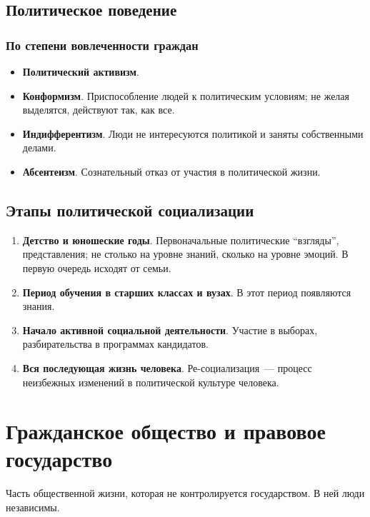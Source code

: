 \documentclass[12pt]{article}
\begin{document}
	\subsection{Политическое поведение}
	
	\subsubsection{По степени вовлеченности граждан}
	\begin{itemize}
		\item \textbf{Политический активизм}.
		\item \textbf{Конформизм}. Приспособление людей к политическим условиям; не желая выделятся, действуют так, как все.
		\item \textbf{Индифферентизм}. Люди не интересуются политикой и заняты собственными делами.
		\item \textbf{Абсентеизм}. Сознательный отказ от участия в политической жизни.
	\end{itemize}
	
	\subsection{Этапы политической социализации}
	\begin{enumerate}
		\item \textbf{Детство и юношеские годы}. Первоначальные политические ``взгляды'', представления; не столько на уровне знаний, сколько на уровне эмоций. В первую очередь исходят от семьи.
		\item \textbf{Период обучения в старших классах и вузах}. В этот период появляются знания.
		\item \textbf{Начало активной социальной деятельности}. Участие в выборах, разбирательства в программах кандидатов.
		\item \textbf{Вся последующая жизнь человека}. Ре-социализация~--- процесс неизбежных изменений в политической культуре человека.
	\end{enumerate}
	
	\section{Гражданское общество и правовое государство}
	
	\begin{definition}
		Часть общественной жизни, которая не контролируется государством. В ней люди независимы.
	\end{definition}
	
\end{document}
